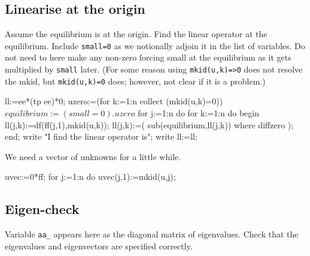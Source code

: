 \documentclass[11pt,a5paper]{article}
\begin{document}
\subsection{Linearise at the origin}

Assume the equilibrium is at the origin. Find the linear
operator at the equilibrium.  Include \verb|small=0| as we
notionally adjoin it in the list of variables.  Do not need
to here make any non-zero forcing small at the equilibrium
as it gets multiplied by \verb|small| later.  (For some
reason using \verb|mkid(u,k)=>0| does not resolve the mkid,
but \verb|mkid(u,k)=0| does; however, not clear if it is a
problem.)
\begin{reduce}
ll:=ee*(tp ee)*0; %
uzero:=(for k:=1:n collect (mkid(u,k)=0))$
equilibrium:=(small=0).uzero$
for j:=1:n do for k:=1:n do begin 
  ll(j,k):=df(ff(j,1),mkid(u,k));
  ll(j,k):=( sub(equilibrium,ll(j,k)) where diffzero );
end;
write "I find the linear operator is";
write ll:=ll;
\end{reduce}

We need a vector of unknowns for a little while.
\begin{reduce}
uvec:=0*ff; %
for j:=1:n do uvec(j,1):=mkid(u,j);
\end{reduce}



\subsection{Eigen-check}

Variable \verb|aa_| appears here as the diagonal matrix of
eigenvalues. Check that the eigenvalues and eigenvectors are
specified correctly.
\end{document}
